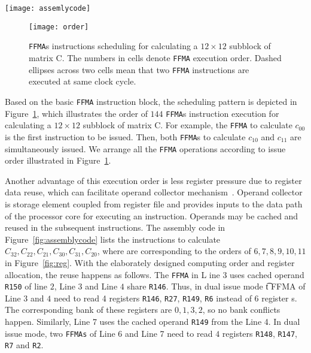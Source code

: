 \begin{figure*}[htbp]
\begin{center}
\texttt{[image: assemlycode]}
    \caption{The comparison of compiler generated codes and our tuned assembly codes.}
\label{fig:assemblycode}
\end{center}
\end{figure*}

\begin{figure}[htbp]
\begin{center}
\texttt{[image: order]}
\caption{{\tt FFMA}s instructions scheduling for calculating a $12\times 12$ subblock of matrix C.  The numbers in cells
 denote {\tt FFMA} execution order. Dashed ellipses across two cells mean that two {\tt FFMA} instructions are executed 
at same clock cycle.}
\label{fig:order}
\end{center}
\end{figure}

Based on the basic {\tt FFMA} instruction block, the scheduling pattern is depicted in Figure~\ref{fig:order}, which
illustrates the order of $144$ {\tt FFMA}s instruction execution for calculating a $12\times 12$ subblock of matrix C.
For example, the {\tt FFMA} to calculate $c_{00}$ is the first instruction to be issued. Then, both {\tt FFMA}s to
calculate $c_{10}$ and  $c_{11}$ are simultaneously issued. We arrange all the {\tt FFMA} operations according to issue
order illustrated in Figure~\ref{fig:order}.

Another advantage of this execution order is less register pressure due to register data reuse, which can facilitate
operand collector mechanism~\cite{collector}. Operand collector is storage element coupled from register file and
provides inputs to the data path of the processor core for executing an instruction. Operands may be cached and reused
in the subsequent instructions. 
The assembly code in Figure~\ref{fig:assemblycode} lists the instructions to calculate $C_{32},C_{22}, C_{21}, C_{30}, C
_{31}, C_{20}$, where are corresponding to the orders of $6,7,8,9,10,11$ in Figure~\ref{fig:reg}. 
With the elaborately designed computing order and register allocation, the reuse happens as follows. The {\tt FFMA} in L
ine $3$ uses cached operand {\tt R150} of line $2$, Line $3$ and Line $4$ share {\tt R146}. Thus, in dual issue mode {\t
t FFMA} of Line $3$ and $4$ need to read 4 registers {\tt R146}, {\tt R27}, {\tt R149}, {\tt R6} instead of $6$ register
s. The corresponding bank of these registers are $0,1,3,2$, so no bank conflicts happen.
Similarly, Line 7 uses the cached operand {\tt R149} from the Line 4. In dual issue mode, two {\tt FFMAs} of Line 6 and 
Line 7 need to read $4$ registers {\tt R148}, {\tt R147}, {\tt R7} and {\tt R2}.

